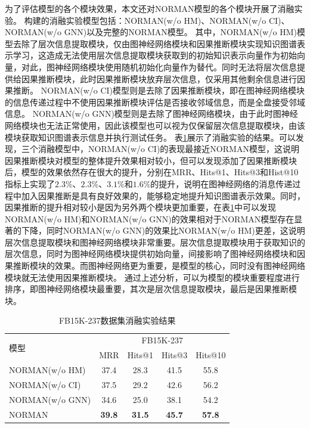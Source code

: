 \documentclass[algorithmlist, AutoFakeBold, AutoFakeSlant, figurelist, tablelist, nomlist, engineering]{seuthesix}
\begin{document}
为了评估模型的各个模块效果，本文还对NORMAN模型的各个模块开展了消融实验。
构建的消融实验模型包括：NORMAN(w/o HM)、NORMAN(w/o CI)、NORMAN(w/o GNN)以及完整的NORMAN模型。
其中，NORMAN(w/o HM)模型去除了层次信息提取模块，仅由图神经网络模块和因果推断模块实现知识图谱表示学习，这造成无法使用层次信息提取模块获取到的初始知识表示向量作为初始向量，对此，图神经网络模块使用随机初始化向量作为替代。同时无法将层次信息提供给因果推断模块，此时因果推断模块放弃层次信息，仅采用其他剩余信息进行因果推断。
NORMAN(w/o CI)模型则是去除了因果推断模块，即在图神经网络模块的信息传递过程中不使用因果推断模块评估是否接收邻域信息，而是全盘接受邻域信息。
NORMAN(w/o GNN)模型则是去除了图神经网络模块，由于此时图神经网络模块也无法正常使用，因此该模型也可以视为仅保留层次信息提取模块，由该模块获取知识图谱表示信息并执行测试任务。
表\ref{Experiment1_ablation}展示了消融实验的结果。可以发现，三个消融模型中，NORMAN(w/o CI)的表现最接近NORMAN模型，这说明因果推断模块对模型的整体提升效果相对较小，但可以发现添加了因果推断模块后，模型的效果依然存在很大的提升，分别在MRR、Hits@1、Hits@3和Hist@10指标上实现了$2.3\%$、$2.3\%$、$3.1\%$和$1.6\%$的提升，说明在图神经网络的消息传递过程中加入因果推断是具有良好效果的，能够稳定地提升知识图谱表示效果。同时，因果推断的提升相对较小是因为另外两个模块更加重要，在表\ref{Experiment1_ablation}中可以发现NORMAN(w/o HM)和NORMAN(w/o GNN)的效果相对于NORMAN模型存在显著的下降，同时NORMAN(w/o GNN)的效果比NORMAN(w/o HM)更差，这说明层次信息提取模块和图神经网络模块非常重要。层次信息提取模块用于获取知识的层次信息，同时为图神经网络模块提供初始向量，间接影响了图神经网络模块和因果推断模块的效果。而图神经网络更为重要，是模型的核心，同时没有图神经网络模块就无法使用因果推断模块。
通过上述分析，可以为模型的模块重要程度进行排序，即图神经网络模块最重要，其次是层次信息提取模块，最后是因果推断模块。
\begin{table}[]
  \centering
  \begin{tabular*}{0.95\textwidth}{@{\extracolsep{\fill}}lcccc}
  \toprule[1pt]
  \multirow{2}{*}{模型} & \multicolumn{4}{c}{FB15K-237} \\
    & MRR & Hits@1 & Hits@3 & Hits@10 \\ \hline
  NORMAN(w/o HM) & 37.4 & 28.3 & 41.5 & 55.8 \\
  NORMAN(w/o CI) & 37.5 & 29.2 & 42.6 & 56.2 \\
  NORMAN(w/o GNN) & 34.6 & 25.0 & 38.1 & 54.2 \\
  NORMAN & \textbf{39.8} & \textbf{31.5} & \textbf{45.7} & \textbf{57.8} \\
  \bottomrule[1pt]
  \end{tabular*}
  \caption{FB15K-237数据集消融实验结果}
  \label{Experiment1_ablation}
\end{table}
\end{document}
